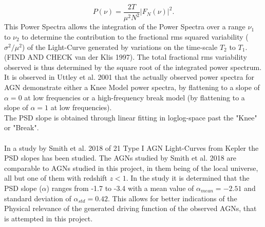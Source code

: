 \documentclass[a4paper, 12pt, twoside]{article}
\begin{document}
\begin{equation}
P(\nu) = \frac{2T}{\mu^{2}N^{2}}|F_{N}(\nu)|^{2}.
\label{eq:Power_Spectra}
\end{equation} 
This Power Spectra allows the integration of the Power Spectra over a range $\nu_{1}$ to $\nu_{2}$ to determine the contribution to the fractional rms squared variability ($\sigma^{2}/\mu^{2}$) of the Light-Curve generated by variations on the time-scale $T_{2}$ to $T_{1}$. (FIND AND CHECK van der Klis 1997). The total fractional rms variability observed is thus determined by the square root of the integrated power spectrum. It is observed in Uttley et al. 2001 that the actually observed power spectra for AGN demonstrate either a Knee Model power spectra, by flattening to a slope of $\alpha=0$ at low frequencies or a high-frequency break model (by flattening to a slope of $\alpha=1$ at low frequencies). \\
The PSD slope is obtained through linear fitting in loglog-space past the "Knee" or "Break". \\
\\
In a study by Smith et al. 2018 of 21 Type I AGN Light-Curves from Kepler the PSD slopes has been studied. The AGNs studied by Smith et al. 2018 are comparable to AGNs studied in this project, in them being of the local universe, all but one of them with redshift $z<1$. In the study it is determined that the PSD slope ($\alpha$) ranges from -1.7 to -3.4 with a mean value of $\alpha_{mean}=-2.51$ and standard deviation of $\alpha_{std}=0.42$. This allows for better indications of the Physical relevance of the generated driving function of the observed AGNs, that is attempted in this project. 
\end{document}
